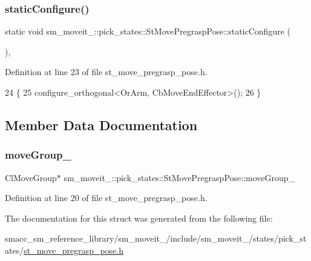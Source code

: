 \subsubsection{\texorpdfstring{static\+Configure()}{staticConfigure()}}
{\footnotesize\ttfamily static void sm\+\_\+moveit\+\_\+::pick\+\_\+states\+::\+St\+Move\+Pregrasp\+Pose\+::static\+Configure (\begin{DoxyParamCaption}{ }\end{DoxyParamCaption})\hspace{0.3cm}{\ttfamily [inline]}, {\ttfamily [static]}}



Definition at line 23 of file st\+\_\+move\+\_\+pregrasp\+\_\+pose.\+h.


\begin{DoxyCode}
24             \{
25                 configure\_orthogonal<OrArm, CbMoveEndEffector>();
26             \}
\end{DoxyCode}


\subsection{Member Data Documentation}
\mbox{\label{structsm__moveit__4_1_1pick__states_1_1StMovePregraspPose_a7ac8229ab37dba1b2eb43668e4adceea}} 
\subsubsection{\texorpdfstring{move\+Group\+\_\+}{moveGroup\_}}
{\footnotesize\ttfamily Cl\+Move\+Group$\ast$ sm\+\_\+moveit\+\_\+::pick\+\_\+states\+::\+St\+Move\+Pregrasp\+Pose\+::move\+Group\+\_\+}



Definition at line 20 of file st\+\_\+move\+\_\+pregrasp\+\_\+pose.\+h.



The documentation for this struct was generated from the following file\+:\begin{DoxyCompactItemize}
\item 
smacc\+\_\+sm\+\_\+reference\+\_\+library/sm\+\_\+moveit\+\_/include/sm\+\_\+moveit\+\_/states/pick\+\_\+states/\hyperlink{4_2include_2sm__moveit__4_2states_2pick__states_2st__move__pregrasp__pose_8h}{st\+\_\+move\+\_\+pregrasp\+\_\+pose.\+h}\end{DoxyCompactItemize}
